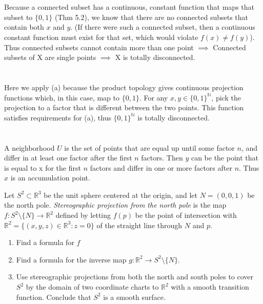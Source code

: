 \documentclass{jhwhw}
\newcommand{\R}{{\mathbb R}}
\newcommand{\N}{{\mathbb N}}
\begin{document}
\part{}%
Because a connected subset has a continuous, constant function that maps that subset to $\{0,1\}$ (Thm 5.2), we know that there are no connected subsets that contain both $x$ and $y$. (If there were such a connected subset, then a continuous constant function must exist for that set, which would violate $f(x)\neq f(y)$). Thus connected subsets cannot contain more than one point $\implies$ Connected subsets of X are single points $\implies$ X is totally disconnected.
\part{}%
Here we apply (a) because the product topology gives continuous projection functions which, in this case, map to $\{0,1\}$. For any $x,y\in \{0,1\}^\N$, pick the projection to a factor that is different between the two points. This function satisfies requirements for (a), thus $\{0,1\}^{\N}$ is totally disconnected.
\part{}%
A neighborhood $U$ is the set of points that are equal up until some factor $n$, and differ in at least one factor after the first $n$ factors. Then $y$ can be the point that is equal to x for the first $n$ factors and differ in one or more factors after $n$. Thus $x$ is an accumulation point.

\problem{}%
Let $S^2\subset \mathbb{R}^3$ be the unit sphere centered at the origin, and  let $N = (0,0,1)$ be the north pole.  \emph{Stereographic  projection from the north pole} is the map   $f:S^2\setminus\{N\}\to\mathbb{R}^2$ defined by letting  $f(p)$ be the point of intersection with $\mathbb{R}^2 = \{(x,y,z)\in\mathbb{R}^3:z=0\}$ of the straight line through $N$ and $p$.  
\begin{enumerate}
	\item Find a formula for $f$
	\item Find a formula for the inverse map $g:\mathbb{R}^2\to S^2\setminus 
	\{N\}$. 
	\item
	Use stereographic projections from both the north and south poles to cover $S^2$ by the domain of two coordinate charts to $\R^2$ with a smooth transition function.  Conclude that $S^2$ is a smooth surface.
\end{enumerate} 
\end{document}
